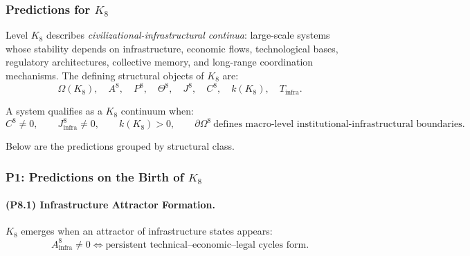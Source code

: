 

\subsubsection{Predictions for \texorpdfstring{$K_8$}{K_8}}
\label{sec:predictions-k8}

Level $K_8$ describes \emph{civilizational-infrastructural continua}:
large-scale systems whose stability depends on infrastructure,
economic flows, technological bases, regulatory architectures,
collective memory, and long-range coordination mechanisms.
The defining structural objects of $K_8$ are:
\[
\Omega(K_8),\quad A^{8},\quad P^{8},\quad \Theta^{8},\quad
J^{8},\quad C^{8},\quad k(K_8),\quad T_{\mathrm{infra}}.
\]

A system qualifies as a $K_8$ continuum when:
\[
C^{8} \neq 0,\qquad
J^{8}_{\mathrm{infra}} \neq 0,\qquad
k(K_8) > 0,\qquad
\partial\Omega^{8} \ \text{defines macro-level institutional-infrastructural boundaries}.
\]

Below are the predictions grouped by structural class.

\subsubsection{P1: Predictions on the Birth of \texorpdfstring{$K_8$}{K_8}}

\paragraph{(P8.1) Infrastructure Attractor Formation.}
$K_8$ emerges when an attractor of infrastructure states appears:
\[
A_{\mathrm{infra}}^8 \neq 0
\iff
\text{persistent technical–economic–legal cycles form}.
\]

